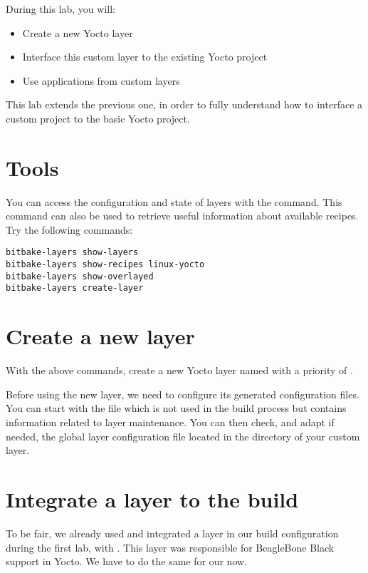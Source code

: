 
During this lab, you will:
\begin{itemize}
  \item Create a new Yocto layer
  \item Interface this custom layer to the existing Yocto project
  \item Use applications from custom layers
\end{itemize}

This lab extends the previous one, in order to fully understand how to interface
a custom project to the basic Yocto project.

\section{Tools}

You can access the configuration and state of layers with the
 command. This command can also be used to retrieve useful
information about available recipes. Try the following commands:
\begin{verbatim}
bitbake-layers show-layers
bitbake-layers show-recipes linux-yocto
bitbake-layers show-overlayed
bitbake-layers create-layer
\end{verbatim}

\section{Create a new layer}

With the above commands, create a new Yocto layer named
 with a priority of .

Before using the new layer, we need to configure its generated configuration
files. You can start with the  file which is not used in the build
process but contains information related to layer maintenance. You can then
check, and adapt if needed, the global layer configuration file located in the
 directory of your custom layer.

\section{Integrate a layer to the build}

To be fair, we already used and integrated a layer in our build configuration
during the first lab, with . This layer was responsible for
BeagleBone Black support in Yocto. We have to do the same for our
 now.

